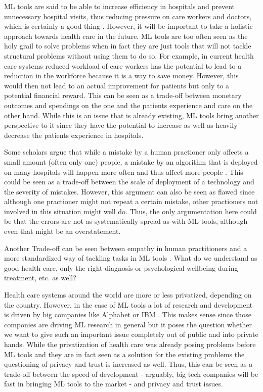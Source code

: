 ML tools are said to be able to increase efficiency in hospitals and prevent unnecessary hospital visits, thus reducing pressure on care workers and doctors, which is certainly a good thing \cite{horgan2019artificial}. However, it will be important to take a holistic approach towards health care in the future. ML tools are too often seen as the holy grail to solve problems when in fact they are just tools that will not tackle structural problems without using them to do so. For example, in current health care systems reduced workload of care workers has the potential to lead to a reduction in the workforce because it is a way to save money. However, this would then not lead to an actual improvement for patients but only to a potential financial reward. This can be seen as a trade-off between monetary outcomes and spendings on the one  and the patients experience and care on the other hand. While this is an issue that is already existing, ML tools bring another perspective to it since they have the potential to increase as well as heavily decrease the patients experience in hospitals.


Some scholars argue that while a mistake by a human practioner only affects a small amount (often only one) people, a mistake by an algorithm that is deployed on many hospitals will happen more often and thus affect more people \cite{Morley2020}. This could be seen as a trade-off between the scale of deployment of a technology and the severity of mistakes. However, this argument can also be seen as flawed since although one practioner might not repeat a certain mistake, other practioners not involved in this situation might well do. Thus, the only argumentation here could be that the errors are not as systematically spread as with ML tools, although even that might be an overstatement.


Another Trade-off can be seen between empathy in human practitioners and a more standardized way of tackling tasks in ML tools \cite{Morley2020}. What do we understand as good health care, only the right diagnosis or psychological wellbeing during treatment, etc. as well? 



Health care systems around the world are more or less privatized, depending on the country. However, in the case of ML tools a lot of research and development is driven by big companies like Alphabet or IBM \cite{Morley2020}. This makes sense since those componies are driving ML research in general but it poses the question whether we want to give such an important issue completely out of public and into private hands. While the privatization of health care was already posing problems before ML tools and they are in fact seen as a solution for the existing problems \cite{Morley2020, topol2019high} the questioning of privacy and trust is increased as well. Thus, this can be seen as a trade-off between the speed of development - arguably, big tech companies will be fast in bringing ML tools to the market - and privacy and trust issues.